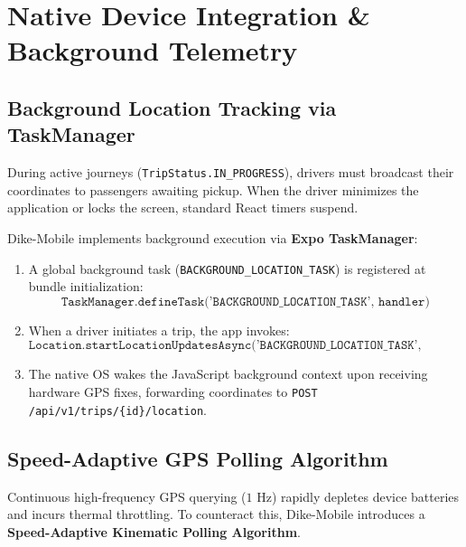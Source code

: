 \documentclass[conference,10pt,a4paper]{IEEEtran}
\begin{document}
\section{Native Device Integration \& Background Telemetry}

\subsection{Background Location Tracking via TaskManager}
During active journeys (\texttt{TripStatus.IN\_PROGRESS}), drivers must broadcast their coordinates to passengers awaiting pickup. When the driver minimizes the application or locks the screen, standard React timers suspend.

Dike-Mobile implements background execution via \textbf{Expo TaskManager}:
\begin{enumerate}
    \item A global background task (\texttt{BACKGROUND\_LOCATION\_TASK}) is registered at bundle initialization:
    \begin{equation}
    \texttt{TaskManager.defineTask('BACKGROUND\_LOCATION\_TASK', handler)}
    \end{equation}
    \item When a driver initiates a trip, the app invokes:
    \begin{equation}
    \texttt{Location.startLocationUpdatesAsync('BACKGROUND\_LOCATION\_TASK', options)}
    \end{equation}
    \item The native OS wakes the JavaScript background context upon receiving hardware GPS fixes, forwarding coordinates to \texttt{POST /api/v1/trips/\{id\}/location}.
\end{enumerate}

\subsection{Speed-Adaptive GPS Polling Algorithm}
Continuous high-frequency GPS querying ($1\text{ Hz}$) rapidly depletes device batteries and incurs thermal throttling. To counteract this, Dike-Mobile introduces a \textbf{Speed-Adaptive Kinematic Polling Algorithm}.
\end{document}
